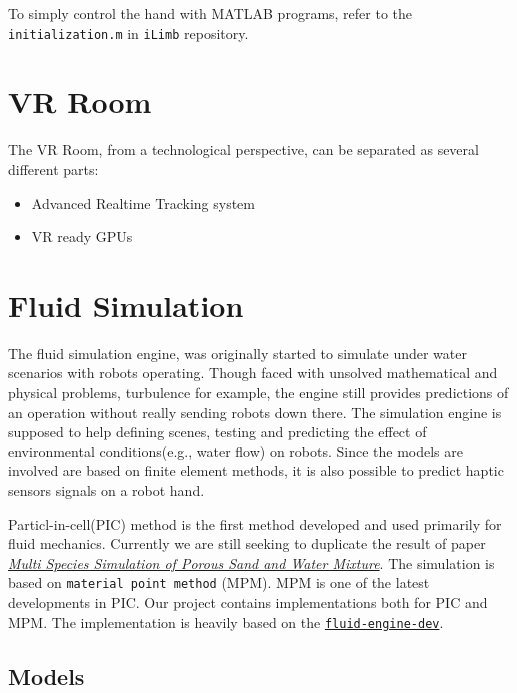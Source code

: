 \documentclass[11pt]{article}
\begin{document}
To simply control the hand with MATLAB programs, refer to the \texttt{initialization.m} in \texttt{iLimb} repository.


\section{VR Room}
\label{sec:orgheadline6}
The VR Room, from a technological perspective, can be separated as several different parts:
\begin{itemize}
\item Advanced Realtime Tracking system
\item VR ready GPUs
\end{itemize}



\section{Fluid Simulation}
\label{sec:orgheadline8}
The fluid simulation engine, was originally started to simulate under water scenarios with robots operating. Though faced with unsolved mathematical and physical problems, turbulence for example, the engine still provides predictions of an operation without really sending robots down there. The simulation engine is supposed to help defining scenes, testing and predicting the effect of environmental conditions(e.g., water flow) on robots. Since the models are involved are based on finite element methods, it is also possible to predict haptic sensors signals on a robot hand.

Particl-in-cell(PIC) method is the first method developed and used primarily for fluid mechanics.  Currently we are still seeking to duplicate the result of paper \href{https://www.math.ucla.edu/~jteran/papers/PGKFTJM17.pdf}{\emph{Multi Species Simulation of Porous Sand and Water Mixture}}. The simulation is based on \texttt{material point method} (MPM). MPM is one of the latest developments in PIC. Our project contains implementations both for PIC and MPM. The implementation is heavily based on the \href{https://github.com/doyubkim/fluid-engine-dev}{\texttt{fluid-engine-dev}}. 

\subsection{Models}
\label{sec:orgheadline7}
\end{document}
